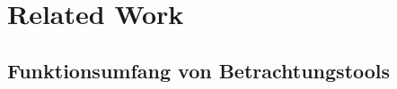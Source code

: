 \section{Related Work}
\label{sec:relatedWork}

\subsection{Funktionsumfang von Betrachtungstools}
\label{sec:Motivation}

